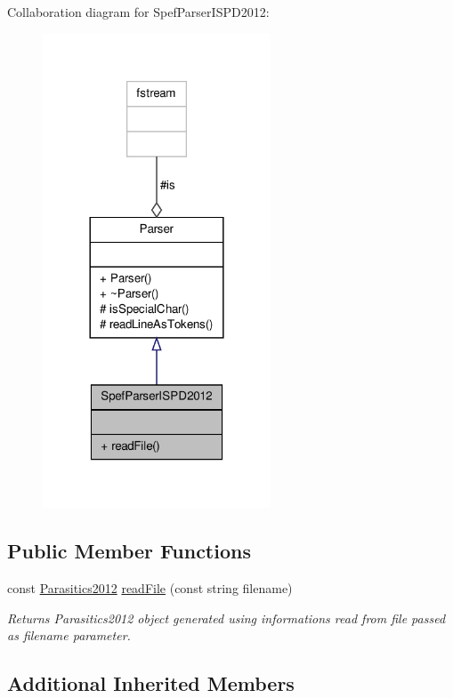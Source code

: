 Collaboration diagram for Spef\-Parser\-I\-S\-P\-D2012\-:\nopagebreak
\begin{figure}[H]
\begin{center}
\leavevmode
\includegraphics[width=192pt]{classSpefParserISPD2012__coll__graph}
\end{center}
\end{figure}
\subsection*{Public Member Functions}
\begin{DoxyCompactItemize}
\item 
const \hyperlink{spef__net_8h_a37551e9359ee22bb0821ca94784447d4}{Parasitics2012} \hyperlink{classSpefParserISPD2012_a130209fe17a1d791cd03543304e48d5e}{read\-File} (const string filename)
\begin{DoxyCompactList}\small\item\em Returns Parasitics2012 object generated using informations read from file passed as filename parameter. \end{DoxyCompactList}\end{DoxyCompactItemize}
\subsection*{Additional Inherited Members}


